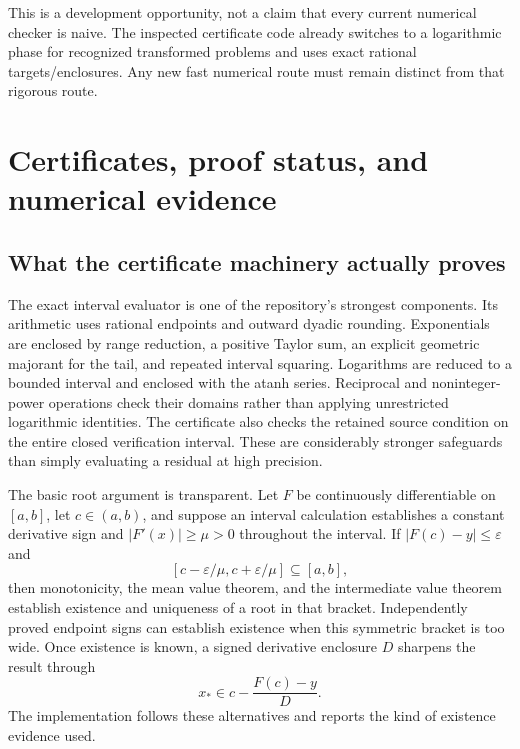 \documentclass[11pt,a4paper]{article}
\begin{document}
This is a development opportunity, not a claim that every current numerical checker is naive. The inspected certificate code already switches to a logarithmic phase for recognized transformed problems and uses exact rational targets/enclosures. Any new fast numerical route must remain distinct from that rigorous route.\cite{repo-certificate,repo-gamma}

\section{Certificates, proof status, and numerical evidence}
\label{sec:certificates}

\subsection{What the certificate machinery actually proves}
The exact interval evaluator is one of the repository's strongest components. Its arithmetic uses rational endpoints and outward dyadic rounding. Exponentials are enclosed by range reduction, a positive Taylor sum, an explicit geometric majorant for the tail, and repeated interval squaring. Logarithms are reduced to a bounded interval and enclosed with the atanh series. Reciprocal and noninteger-power operations check their domains rather than applying unrestricted logarithmic identities. The certificate also checks the retained source condition on the entire closed verification interval. These are considerably stronger safeguards than simply evaluating a residual at high precision.\cite{repo-certificate}

The basic root argument is transparent. Let \(F\) be continuously differentiable on \([a,b]\), let \(c\in(a,b)\), and suppose an interval calculation establishes a constant derivative sign and \(|F'(x)|\geq\mu>0\) throughout the interval. If \(|F(c)-y|\leq\varepsilon\) and
\[
[c-\varepsilon/\mu,c+\varepsilon/\mu]\subseteq[a,b],
\]
then monotonicity, the mean value theorem, and the intermediate value theorem establish existence and uniqueness of a root in that bracket. Independently proved endpoint signs can establish existence when this symmetric bracket is too wide. Once existence is known, a signed derivative enclosure \(D\) sharpens the result through
\[
x_*\in c-\frac{F(c)-y}{D}.
\]
The implementation follows these alternatives and reports the kind of existence evidence used.\cite{repo-certificate}
\end{document}
